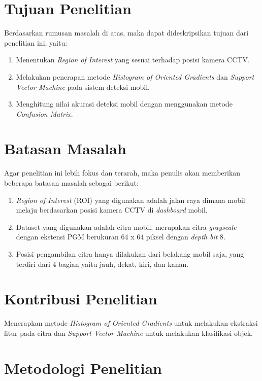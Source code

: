 \section{Tujuan Penelitian}

Berdasarkan rumusan masalah di atas, maka dapat dideskripsikan tujuan dari penelitian ini, yaitu:
\begin{enumerate}[nolistsep,leftmargin=0.5cm]
	\item 
	Menentukan \textit{Region of Interest} yang sesuai terhadap posisi kamera CCTV.
	\item 
	Melakukan penerapan metode \textit{Histogram of Oriented Gradients} dan \textit{Support Vector Machine} pada sistem deteksi mobil.
	\item
	Menghitung nilai akurasi deteksi mobil dengan menggunakan metode \textit{Confusion Matrix}.
	\\
\end{enumerate}

\section{Batasan Masalah}

Agar penelitian ini lebih fokus dan terarah, maka penulis akan memberikan beberapa batasan masalah sebagai berikut:
\begin{enumerate}[nolistsep,leftmargin=0.5cm]
	\item 
	\textit{Region of Interest} (ROI) yang digunakan adalah jalan raya dimana mobil melaju berdasarkan posisi kamera CCTV di \textit{dashboard} mobil.
	\item
	Dataset yang digunakan adalah citra mobil, merupakan citra \textit{grayscale} dengan ekstensi PGM berukuran 64 x 64 piksel dengan \textit{depth bit} 8. 
	\item
	Posisi pengambilan citra hanya dilakukan dari belakang mobil saja, yang terdiri dari 4 bagian yaitu jauh, dekat, kiri, dan kanan.
	\\
\end{enumerate}

\section{Kontribusi Penelitian}
Menerapkan metode \textit{Histogram of Oriented Gradients} untuk melakukan ekstraksi fitur pada citra dan \textit{Support Vector Machine} untuk melakukan klasifikasi objek.\\

\section{Metodologi Penelitian}

